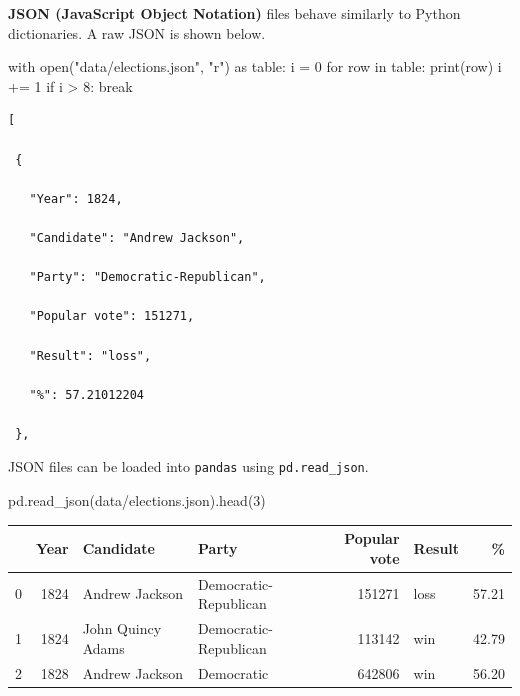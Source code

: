 \documentclass[
  letterpaper,
  DIV=11,
  numbers=noendperiod]{scrreprt}
\newenvironment{Shaded}{\begin{snugshade}}{\end{snugshade}}
\newcommand{\BuiltInTok}[1]{\textcolor[rgb]{0.00,0.23,0.31}{#1}}
\newcommand{\ControlFlowTok}[1]{\textcolor[rgb]{0.00,0.23,0.31}{#1}}
\newcommand{\DecValTok}[1]{\textcolor[rgb]{0.68,0.00,0.00}{#1}}
\newcommand{\ImportTok}[1]{\textcolor[rgb]{0.00,0.46,0.62}{#1}}
\newcommand{\KeywordTok}[1]{\textcolor[rgb]{0.00,0.23,0.31}{#1}}
\newcommand{\NormalTok}[1]{\textcolor[rgb]{0.00,0.23,0.31}{#1}}
\newcommand{\OperatorTok}[1]{\textcolor[rgb]{0.37,0.37,0.37}{#1}}
\newcommand{\StringTok}[1]{\textcolor[rgb]{0.13,0.47,0.30}{#1}}
\begin{document}
\textbf{JSON (JavaScript Object Notation)} files behave similarly to
Python dictionaries. A raw JSON is shown below.

\begin{Shaded}
\begin{Highlighting}[]
\ControlFlowTok{with} \BuiltInTok{open}\NormalTok{(}\StringTok{"data/elections.json"}\NormalTok{, }\StringTok{"r"}\NormalTok{) }\ImportTok{as}\NormalTok{ table:}
\NormalTok{    i }\OperatorTok{=} \DecValTok{0}
    \ControlFlowTok{for}\NormalTok{ row }\KeywordTok{in}\NormalTok{ table:}
        \BuiltInTok{print}\NormalTok{(row)}
\NormalTok{        i }\OperatorTok{+=} \DecValTok{1}
        \ControlFlowTok{if}\NormalTok{ i }\OperatorTok{\textgreater{}} \DecValTok{8}\NormalTok{:}
            \ControlFlowTok{break}
\end{Highlighting}
\end{Shaded}

\begin{verbatim}
[

 {

   "Year": 1824,

   "Candidate": "Andrew Jackson",

   "Party": "Democratic-Republican",

   "Popular vote": 151271,

   "Result": "loss",

   "%": 57.21012204

 },
\end{verbatim}

JSON files can be loaded into \texttt{pandas} using
\texttt{pd.read\_json}.

\begin{Shaded}
\begin{Highlighting}[]
\NormalTok{pd.read\_json(}\StringTok{\textquotesingle{}data/elections.json\textquotesingle{}}\NormalTok{).head(}\DecValTok{3}\NormalTok{)}
\end{Highlighting}
\end{Shaded}

\begin{tabular}{lrllrlr}
\toprule
{} &  Year &          Candidate &                  Party &  Popular vote & Result &     \% \\
\midrule
0 &  1824 &     Andrew Jackson &  Democratic-Republican &        151271 &   loss & 57.21 \\
1 &  1824 &  John Quincy Adams &  Democratic-Republican &        113142 &    win & 42.79 \\
2 &  1828 &     Andrew Jackson &             Democratic &        642806 &    win & 56.20 \\
\bottomrule
\end{tabular}
\end{document}

